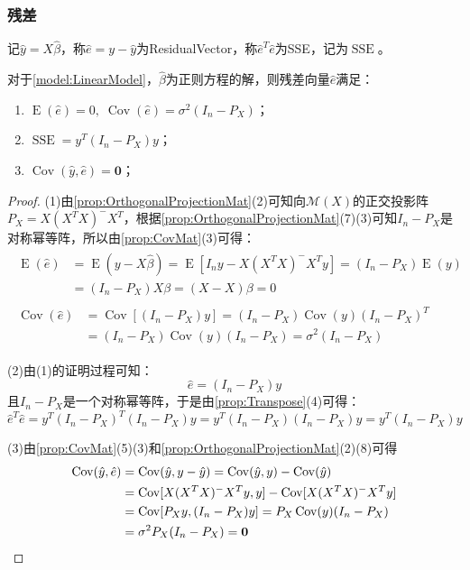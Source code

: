 \subsubsection{残差}
\begin{definition}
	记$\hat{y}=X\hat{\beta}$，称$\hat{e}=y-\hat{y}$为\gls{ResidualVector}，称$\hat{e}^T\hat{e}$为\gls{SSE}，记为$\operatorname{SSE}$。
\end{definition}
\begin{property}\label{prop:ehat}
	对于\cref{model:LinearModel}，$\hat{\beta}$为正则方程的解，则残差向量$\hat{e}$满足：
	\begin{enumerate}
		\item $\operatorname{E}(\hat{e})=0,\;\operatorname{Cov}(\hat{e})=\sigma^2(I_n-P_X)$；
		\item $\operatorname{SSE}=y^T(I_n-P_X)y$；
		\item $\operatorname{Cov}(\hat{y},\hat{e})=\mathbf{0}$；
	\end{enumerate}
\end{property}
\begin{proof}
	(1)由\cref{prop:OrthogonalProjectionMat}(2)可知向$\mathcal{M}(X)$的正交投影阵$P_X=X(X^TX)^-X^T$，根据\cref{prop:OrthogonalProjectionMat}(7)(3)可知$I_n-P_X$是对称幂等阵，所以由\cref{prop:CovMat}(3)可得：
	\begin{gather*}
		\begin{aligned}
			\operatorname{E}(\hat{e})&=\operatorname{E}(y-X\hat{\beta})=\operatorname{E}[I_ny-X(X^TX)^-X^Ty]=(I_n-P_X)\operatorname{E}(y) \\
			&=(I_n-P_X)X\beta=(X-X)\beta=0
		\end{aligned} \\
		\begin{aligned}
			\operatorname{Cov}(\hat{e})&=\operatorname{Cov}[(I_n-P_X)y]=(I_n-P_X)\operatorname{Cov}(y)(I_n-P_X)^T \\
			&=(I_n-P_X)\operatorname{Cov}(y)(I_n-P_X)=\sigma^2(I_n-P_X)
		\end{aligned}
	\end{gather*}\par
	(2)由(1)的证明过程可知：
	\begin{equation*}
		\hat{e}=(I_n-P_X)y
	\end{equation*}
	且$I_n-P_X$是一个对称幂等阵，于是由\cref{prop:Transpose}(4)可得：
	\begin{equation*}
		\hat{e}^T\hat{e}=y^T(I_n-P_X)^T(I_n-P_X)y=y^T(I_n-P_X)(I_n-P_X)y=y^T(I_n-P_X)y
	\end{equation*}\par
	(3)由\cref{prop:CovMat}(5)(3)和\cref{prop:OrthogonalProjectionMat}(2)(8)可得
	\begin{align*}
		\operatorname{Cov}(\hat{y},\hat{e})&=\operatorname{Cov}(\hat{y},y-\hat{y})=\operatorname{Cov}(\hat{y},y)-\operatorname{Cov}(\hat{y}) \\
		&=\operatorname{Cov}[X(X^TX)^-X^Ty,y]-\operatorname{Cov}[X(X^TX)^-X^Ty] \\
		&=\operatorname{Cov}[P_Xy,(I_n-P_X)y]=P_X\operatorname{Cov}(y)(I_n-P_X) \\
		&=\sigma^2P_X(I_n-P_X)=\mathbf{0}\qedhere
	\end{align*}
\end{proof}
